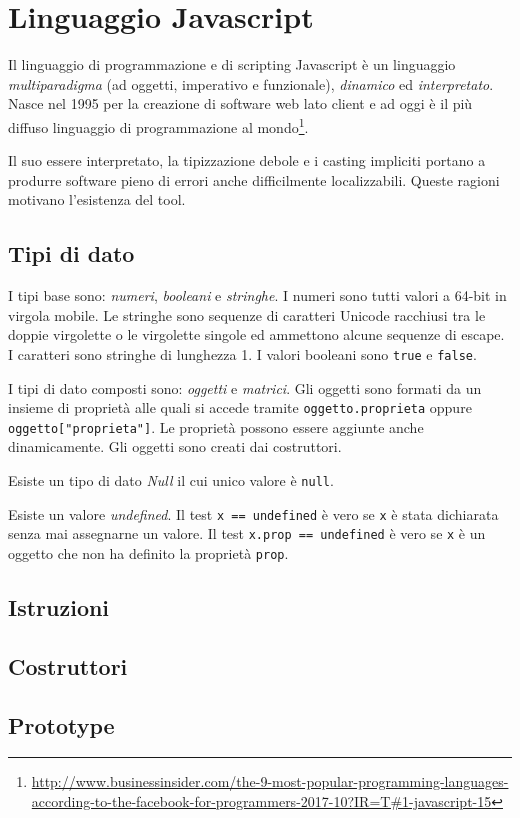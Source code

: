 \chapter{Linguaggio Javascript}

Il linguaggio di programmazione e di scripting Javascript è un linguaggio \emph{multiparadigma} (ad oggetti, imperativo e funzionale), \emph{dinamico} ed \emph{interpretato}. Nasce nel 1995 per la creazione di software web lato client e ad oggi è il più diffuso linguaggio di programmazione al mondo\footnote{\url{http://www.businessinsider.com/the-9-most-popular-programming-languages-according-to-the-facebook-for-programmers-2017-10?IR=T#1-javascript-15}}. 

Il suo essere interpretato, la tipizzazione debole e i casting impliciti portano a produrre software pieno di errori anche difficilmente localizzabili. Queste ragioni motivano l'esistenza del tool. 

\section{Tipi di dato}

I tipi base sono: \emph{numeri}, \emph{booleani} e \emph{stringhe}. I numeri sono tutti valori a 64-bit in virgola mobile. Le stringhe sono sequenze di caratteri Unicode racchiusi tra le doppie virgolette o le virgolette singole ed ammettono alcune sequenze di escape. I caratteri sono stringhe di lunghezza 1. I valori booleani sono \texttt{true} e \texttt{false}. 

I tipi di dato composti sono: \emph{oggetti} e \emph{matrici}. Gli oggetti sono formati da un insieme di proprietà alle quali si accede tramite \texttt{oggetto.proprieta} oppure \texttt{oggetto["proprieta"]}. Le proprietà possono essere aggiunte anche dinamicamente. Gli oggetti sono creati dai costruttori.

Esiste un tipo di dato \emph{Null} il cui unico valore è \texttt{null}. 

Esiste un valore \emph{undefined}. Il test \texttt{x == undefined} è vero se \texttt{x} è stata dichiarata senza mai assegnarne un valore. Il test \texttt{x.prop == undefined} è vero se \texttt{x} è un oggetto che non ha definito la proprietà \texttt{prop}.

\section{Istruzioni}

\section{Costruttori}

\section{Prototype}



